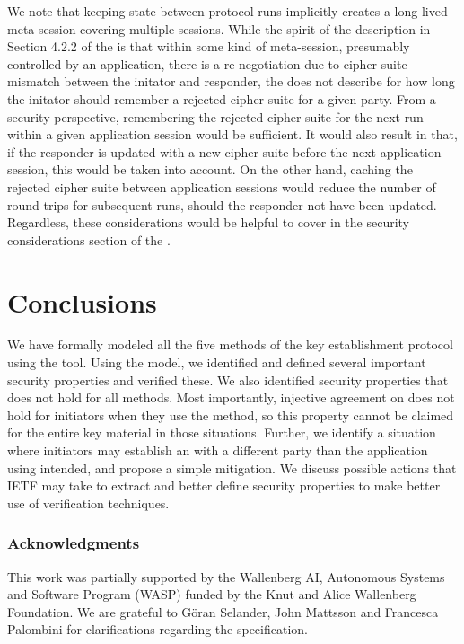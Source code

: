 \documentclass[runningheads,draft,x11names]{llncs}
\begin{document}
We note that keeping state between protocol runs implicitly creates a long-lived
meta-session covering multiple \mEdhoc{} sessions.
%
While the spirit of the description in Section 4.2.2 of the \mSpec{} is that
within some kind of meta-session, presumably controlled by an application,
there is a re-negotiation due to
cipher suite mismatch between the initator and responder, the \mSpec{} does not
describe for how long the initator should remember a rejected cipher suite for a
given party.
%
From a security perspective, remembering the rejected cipher suite for the
next \mEdhoc{} run within a given application session would be sufficient.
%
It would also result in that, if the responder is updated with a new cipher
suite before the next application session, this would be taken into account.
%
On the other hand, caching the rejected cipher suite between application
sessions would reduce the number of round-trips for subsequent runs, should
the responder not have been updated.
%
Regardless, these considerations would be helpful to cover in the security
considerations section of the \mSpec{}.
%

\section{Conclusions}
\label{sec:conclusions}
We have formally modeled all the five
methods of the \mEdhoc{} key establishment protocol using the \mTamarin{} tool.
%
Using the model, we identified and defined several important security properties
and verified these.
%
We also identified security properties that does not hold for all
methods.
%
Most importantly, injective agreement on \mGiy{} does not hold for
initiators when they use the \mStat{} method, so this property cannot be claimed
for the entire key material in those situations.
%
Further, we identify a situation where initiators may establish an \mOscore{}
with a different party than the application using \mEdhoc{} intended, and
propose a simple mitigation.
%
We discuss possible actions that IETF may take to extract and better define
security properties to make better use of verification techniques.
%

\subsubsection*{Acknowledgments} This work was partially supported by
the Wallenberg AI, Autonomous Systems and Software Program (WASP) funded by
the Knut and Alice Wallenberg Foundation.
%
We are grateful to G\"oran Selander, John Mattsson and Francesca Palombini for
clarifications regarding the specification.
%



\end{document}
